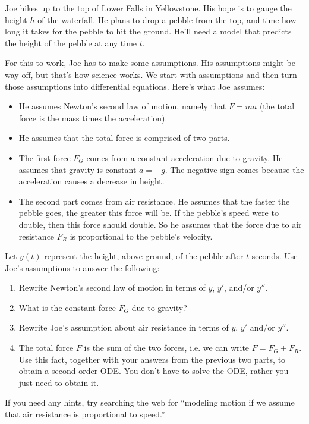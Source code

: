 \begin{problem}
 Joe hikes up to the top of Lower Falls in Yellowstone.  His hope is to gauge the height $h$ of the waterfall.  He plans to drop a pebble from the top, and time how long it takes for the pebble to hit the ground. He'll need a model that predicts the height of the pebble at any time $t$.

 For this to work, Joe has to make some assumptions.  His assumptions might be way off, but that's how science works. We start with assumptions and then turn those assumptions into differential equations. Here's what Joe assumes:
\begin{itemize}
 \item He assumes Newton's second law of motion, namely that $F=ma$ (the total force is the mass times the acceleration).
 \item He assumes that the total force is comprised of two parts.  
 \item The first force $F_G$ comes from a constant acceleration due to gravity. He assumes that gravity is constant $a=-g$. The negative sign comes because the acceleration causes a decrease in height.
 \item The second part comes from air resistance. He assumes that the faster the pebble goes, the greater this force will be. If the pebble's speed were to double, then this force should double.  So he assumes that the force due to air resistance $F_R$ is proportional to the pebble's velocity.
\end{itemize}
Let $y(t)$ represent the height, above ground, of the pebble after $t$ seconds. Use Joe's assumptions to answer the following:
\begin{enumerate}
 \item Rewrite Newton's second law of motion in terms of $y$, $y'$, and/or $y''$. 
 \item What is the constant force $F_G$ due to gravity?
 \item Rewrite Joe's assumption about air resistance in terms of $y$, $y'$ and/or $y''$. 
 \item The total force $F$ is the sum of the two forces, i.e. we can write $F = F_G+F_R$. Use this fact, together with your answers from the previous two parts, to obtain a second order ODE.  You don't have to solve the ODE, rather you just need to obtain it.
\end{enumerate}
If you need any hints, try searching the web for ``modeling motion if we assume that air resistance is proportional to speed.''
\end{problem}

